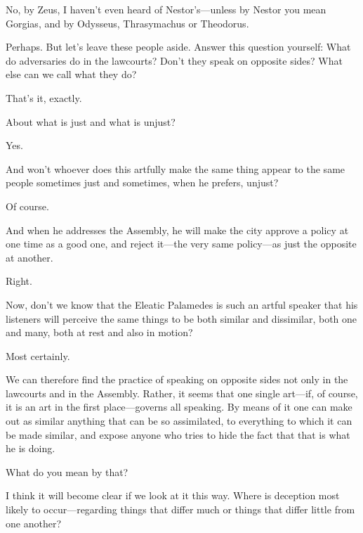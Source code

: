 \sayphaedrus No, by Zeus, I haven't even heard of Nestor's---unless
by Nestor you mean Gorgias, and by Odysseus, Thrasymachus or
Theodorus.

\saysocrates Perhaps. But let's leave these people aside. Answer this
question yourself: What do adversaries do in the lawcourts? Don't they
speak on opposite sides? What else can we call what they do?

\sayphaedrus That's it, exactly.

\saysocrates About what is just and what is unjust?

\sayphaedrus Yes.

\saysocrates And won't whoever does this artfully make the same
thing appear to the same people sometimes just and sometimes, when he
prefers, unjust?

\sayphaedrus Of course.

\saysocrates And when he addresses the Assembly, he will make the city
approve a policy at one time as a good one, and reject it---the very
same policy---as just the opposite at another.

\sayphaedrus Right.

\saysocrates Now, don't we know that the Eleatic Palamedes is such an
artful speaker that his listeners will perceive the same things to be
both similar and dissimilar, both one and many, both at rest and also in
motion?

\sayphaedrus Most certainly.

\saysocrates We can therefore find the practice of speaking on opposite
sides not only in the lawcourts and in the Assembly. Rather, it
seems that one single art---if, of course, it is an art in the first
place---governs all speaking. By means of it one can make out as similar
anything that can be so assimilated, to everything to which it can be
made similar, and expose anyone who tries to hide the fact that that is
what he is doing.

\sayphaedrus What do you mean by that?

\saysocrates I think it will become clear if we look at it this way. Where
is deception most likely to occur---regarding things that differ much or
things that differ little from one another?

